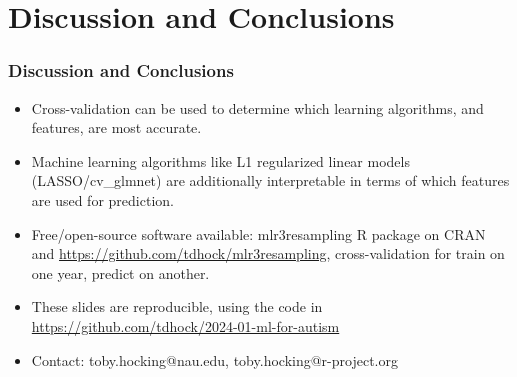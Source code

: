 \documentclass{beamer}
\begin{document}
\section{Discussion and Conclusions}

\begin{frame}
  \frametitle{Discussion and Conclusions}
  \begin{itemize}
  \item Cross-validation can be used to determine which learning
    algorithms, and features, are most accurate.
  \item Machine learning algorithms like L1 regularized linear models
    (LASSO/cv\_glmnet) are additionally interpretable in terms of
    which features are used for prediction.
  \item Free/open-source software available: mlr3resampling R package
    on CRAN and \url{https://github.com/tdhock/mlr3resampling},
    cross-validation for train on one year, predict on another.
\item These slides are reproducible, using the code in \url{https://github.com/tdhock/2024-01-ml-for-autism}
  \item Contact: toby.hocking@nau.edu,
    toby.hocking@r-project.org
  \end{itemize}
\end{frame}
\end{document}
